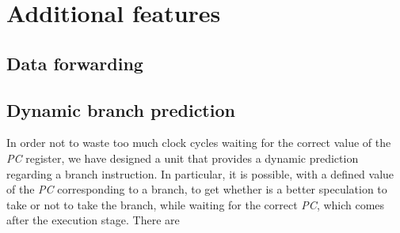 \chapter{Additional features}
\label{chap_add_feat}
\section{Data forwarding}

\section{Dynamic branch prediction}
In order not to waste too much clock cycles waiting for the correct value of the \textit{PC} register, we have designed a unit that provides a dynamic prediction regarding a branch instruction. In particular, it is possible, with a defined value of the \textit{PC} corresponding to a branch, to get whether is a better speculation to take or not to take the branch, while waiting for the correct \textit{PC}, which comes after the execution stage. 
There are 